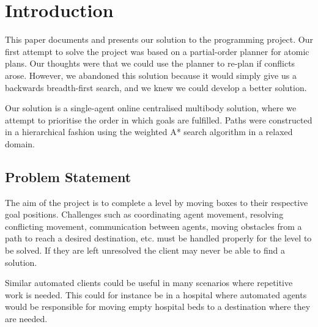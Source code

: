 \section{Introduction}
\label{sec:introduction}


This paper documents and presents our solution to the programming project.
Our first attempt to solve the project was based on a partial-order planner for atomic plans.
Our thoughts were that we could use the planner to re-plan if conflicts arose.
However, we abandoned this solution because it would simply give us a backwards breadth-first search, and we knew we could develop a better solution.

Our solution is a single-agent online centralised multibody solution, where we attempt to prioritise the order in which goals are fulfilled.
Paths were constructed in a hierarchical fashion using the weighted A* search algorithm in a relaxed domain.

\subsection{Problem Statement}

The aim of the project is to complete a level by moving boxes to their respective goal positions.
Challenges such as coordinating agent movement, resolving conflicting movement, communication between agents, moving obstacles from a path to reach a desired destination, etc. must be handled properly for the level to be solved.
If they are left unresolved the client may never be able to find a solution.

Similar automated clients could be useful in many scenarios where repetitive work is needed.
This could for instance be in a hospital where automated agents would be responsible for moving empty hospital beds to a destination where they are needed.





